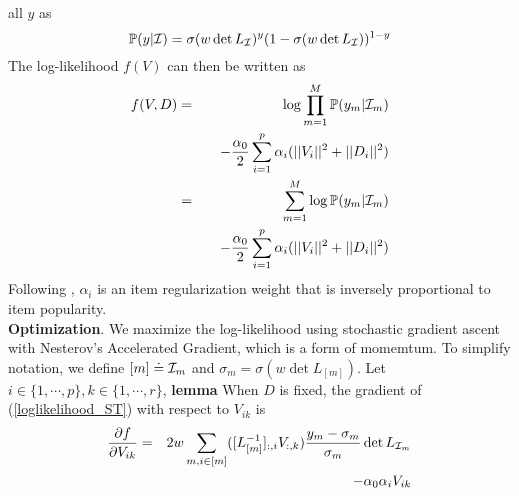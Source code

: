 all $y$ as
\begin{equation}
\label{themodel_y}
\mathbb{P}(y|\mathcal{I}) = \sigma(w \det L_{\mathcal{I}})^y (1-\sigma(w \det L_{\mathcal{I}}))^{1-y} 
\end{equation}
The log-likelihood $f(V)$ can then be written as
\begin{eqnarray}
\label{loglikelihood_ST}
\small
f(V,D) & = & \log \prod_{m=1}^M \pp(y_m|\mcI_m)  \\ 
& & \quad - \frac{\alpha_0}{2} \sum_{i=1}^p \alpha_i (||V_i||^2 + ||D_i||^2) \nonumber \\
& = & \sum_{m=1}^M \log \pp(y_m|\mcI_m) \nonumber \\
& & \quad - \frac{\alpha_0}{2} \sum_{i=1}^p \alpha_i (||V_i||^2 + ||D_i||^2)
\end{eqnarray}
Following \cite{DBLP:conf/aaai/GartrellPK17}, $\alpha_i$ is an item regularization weight that is inversely proportional to item popularity. \\
%
\textbf{Optimization}. We maximize the log-likelihood using stochastic gradient
ascent with Nesterov's Accelerated Gradient, which is a form of momemtum. To
simplify notation, we define $[m] \doteq \mathcal{I}_m$ and $\sigma_m = \sigma(w \det
L_{[m]})$. Let $i \in \{1, \cdots, p \}, k \in \{1, \cdots, r\}$, 
\noindent
\textbf{lemma} When $D$ is fixed, the gradient of (\ref{loglikelihood_ST}) with respect to $V_{ik}$ is
\begin{eqnarray}
\label{ST_Vgradient}
\frac{\partial f}{\partial V_{ik}} & = & 2 w \sum_{m, i \in [m]} ([L_{[m]}^{-1}]_{:,i} V_{:,k}) \frac{y_m-\sigma_m}{\sigma_m} \det L_{\mathcal{I}_m} \\ 
& & - \alpha_0 \alpha_i V_{ik} \nonumber
\end{eqnarray}

